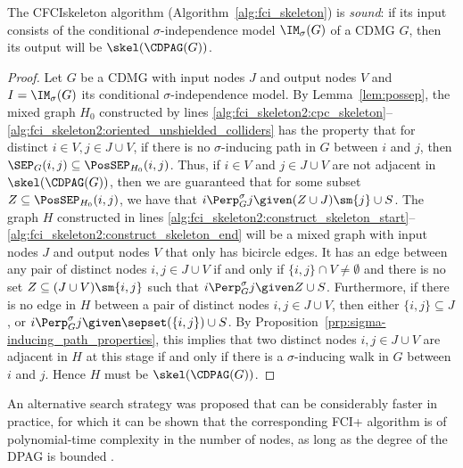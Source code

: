 \begin{Thm}\label{thm:fci_skeleton_sound}
  The CFCIskeleton algorithm (Algorithm~\ref{alg:fci_skeleton}) is \emph{sound}: if its input consists of the conditional $\sigma$-independence model $\IM_\sigma(G)$ of a CDMG $G$, then its output will be $\skel(\CDPAG(G))$.
\end{Thm}
\begin{proof}
  Let $G$ be a CDMG with input nodes $J$ and output nodes $V$ and $I = \IM_\sigma(G)$ its conditional $\sigma$-independence model.
  By Lemma~\ref{lem:possep}, the mixed graph $H_0$ constructed by lines 
  \ref{alg:fci_skeleton2:cpc_skeleton}--\ref{alg:fci_skeleton2:oriented_unshielded_colliders}
  has the property that for distinct $i \in V, j \in J \cup V$, if there is no $\sigma$-inducing path in $G$ between $i$ and $j$, then $\SEP_G(i,j) \subseteq \PosSEP_{H_0}(i,j)$.
  Thus, if $i \in V$ and $j \in J \cup V$ are not adjacent in $\skel(\CDPAG(G))$, then we are guaranteed that for some subset $Z \subseteq \PosSEP_{H_0}(i,j)$, we have that $i \Perp^\sigma_G j \given (Z \cup J) \sm \{j\} \cup S$.
  The graph $H$ constructed in lines \ref{alg:fci_skeleton2:construct_skeleton_start}--\ref{alg:fci_skeleton2:construct_skeleton_end} will be a mixed graph with input nodes $J$ and output nodes $V$ that only has bicircle edges.
  It has an edge between any pair of distinct nodes $i,j \in J\cup V$ if and only if $\{i,j\} \cap V \ne \emptyset$ and there is no set $Z \subseteq (J \cup V) \sm \{i,j\}$ such that $i \Perp^\sigma_G j \given Z \cup S$.
  Furthermore, if there is no edge in $H$ between a pair of distinct nodes $i,j \in J \cup V$, then either $\{i,j\} \subseteq J$, or $i \Perp^\sigma_G j \given \sepset(\{i,j\}) \cup S$.
  By Proposition~\ref{prp:sigma-inducing_path_properties}, this implies that two distinct nodes $i,j \in J \cup V$ are adjacent in $H$ at this stage if and only if there is a $\sigma$-inducing walk in $G$ between $i$ and $j$.
  Hence $H$ must be $\skel(\CDPAG(G))$.
\end{proof}

An alternative search strategy was proposed that can be considerably faster in practice, for which it can be shown that the corresponding FCI+ algorithm is of polynomial-time complexity in the number of nodes, as long as the degree of the DPAG is bounded \cite{ClaassenMooijHeskes_UAI_13}.

